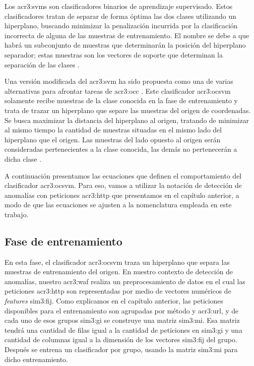 Los \gls{acr3:svm}s son clasificadores binarios de aprendizaje supervisado.
Estos clasificadores tratan de separar de forma óptima las dos clases
utilizando un hiperplano, buscando minimizar la penalización incurrida
por la clasificación incorrecta de alguna de las muestras de entrenamiento.
El nombre se debe a que habrá un subconjunto de muestras que determinarán
la posición del hiperplano separador; estas muestras son los vectores de
soporte que determinan la separación de las clases
\citep{aggarwal2013outlier}. %

Una versión modificada del \gls{acr3:svm} ha sido propuesta como una de
varias alternativas para afrontar tareas de \gls{acr3:occ}
\citep{scholkopf2001estimating}.
Este clasificador \gls{acr3:ocsvm} solamente recibe muestras de la clase
conocida en la fase de entrenamiento y trata de trazar un hiperplano que
separe las muestras del origen de coordenadas. Se busca maximizar la
distancia del hiperplano al origen, tratando de minimizar al mismo tiempo
la cantidad de muestras situadas en el mismo lado del hiperplano que el
origen. Las muestras del lado opuesto al origen serán consideradas
pertenecientes a la clase conocida, las demás no pertenecerán a dicha
clase \citep{khan2009survey}. %

A continuación presentamos las ecuaciones que definen el comportamiento
del clasificador \gls{acr3:ocsvm}. Para eso, vamos a utilizar la notación
de detección de anomalías con peticiones \gls{acr3:http} que presentamos
en el capítulo anterior, a modo de que las ecuaciones se ajusten a la
nomenclatura empleada en este trabajo.


\subsection{Fase de entrenamiento}

En esta fase, el clasificador \gls{acr3:ocsvm} traza un hiperplano que
separa las muestras de entrenamiento del origen.
En nuestro contexto de detección de anomalías, nuestro \gls{acr3:waf}
realiza un preprocesamiento de datos en el cual las peticiones \gls{acr3:http}
son representadas por medio de vectores numéricos de \textit{features}
\gls{sim3:fij}. Como explicamos en el capítulo anterior, las peticiones
disponibles para el entrenamiento son agrupadas por método y \gls{acr3:url},
y de cada uno de esos grupos \gls{sim3:gi} se construye una matriz
\gls{sim3:mi}. Esa matriz tendrá una cantidad de filas igual a la cantidad
de peticiones en \gls{sim3:gi} y una cantidad de columnas igual a la
dimensión de los vectores \gls{sim3:fij} del grupo. Después se entrena
un clasificador por grupo, usando la matriz \gls{sim3:mi} para
dicho entrenamiento.


